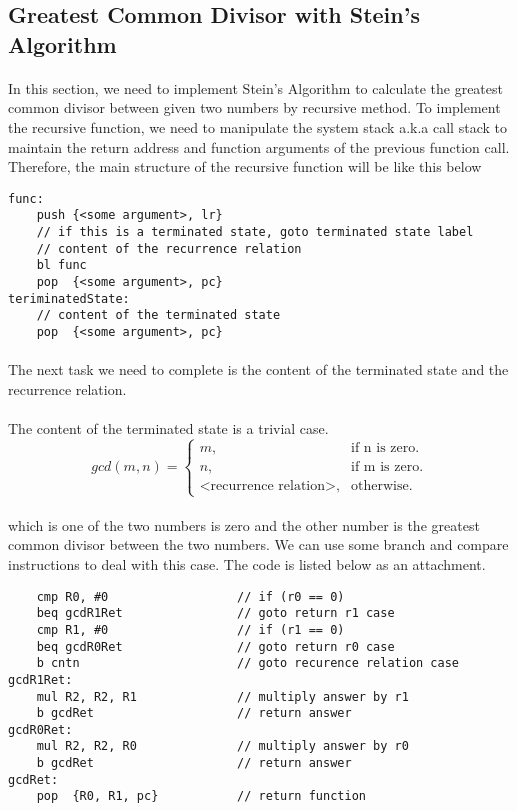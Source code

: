 \subsection{Greatest Common Divisor with Stein's Algorithm}
\paragraph{}
In this section, we need to implement Stein's Algorithm to calculate the greatest common divisor between given two numbers by recursive method. To implement the recursive function, we need to manipulate the system stack a.k.a call stack to maintain the return address and function arguments of the previous function call. Therefore, the main structure of the recursive function will be like this below
\begin{lstlisting}
func:
    push {<some argument>, lr}
    // if this is a terminated state, goto terminated state label
    // content of the recurrence relation
    bl func
    pop  {<some argument>, pc}
teriminatedState:
    // content of the terminated state
    pop  {<some argument>, pc}
\end{lstlisting}
\paragraph{}
The next task we need to complete is the content of the terminated state and the recurrence relation.
\paragraph{}
The content of the terminated state is a trivial case.
\begin{equation}
  gcd(m, n)=\begin{cases}
    m, & \text{if n is zero}.\\
    n, & \text{if m is zero}.\\
    \text{<recurrence relation>}, & \text{otherwise}.
  \end{cases}
\end{equation}
\paragraph{}
which is one of the two numbers is zero and the other number is the greatest common divisor between the two numbers. We can use some branch and compare instructions to deal with this case. The code is listed below as an attachment.
\begin{lstlisting}
    cmp R0, #0                  // if (r0 == 0)
    beq gcdR1Ret                // goto return r1 case
    cmp R1, #0                  // if (r1 == 0)
    beq gcdR0Ret                // goto return r0 case
    b cntn                      // goto recurence relation case
gcdR1Ret:
    mul R2, R2, R1              // multiply answer by r1
    b gcdRet                    // return answer
gcdR0Ret:
    mul R2, R2, R0              // multiply answer by r0
    b gcdRet                    // return answer
gcdRet:
    pop  {R0, R1, pc}           // return function
\end{lstlisting}
